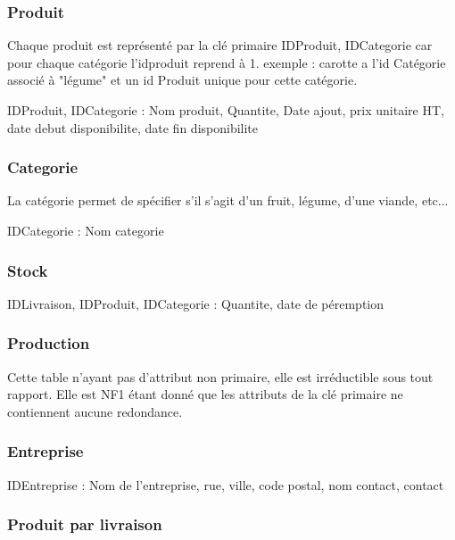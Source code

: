 \documentclass[a4paper, 12pt]{report}
\begin{document}
\begin{spacing}{1.2}
\textcolor{colortitre3}{\subsubsection*{\hypertarget{Produit}{Produit}}}

Chaque produit est représenté par la clé primaire IDProduit, IDCategorie car pour chaque catégorie l'idproduit reprend à 1. exemple : carotte a l'id Catégorie associé à "légume" et un id Produit unique pour cette catégorie.

IDProduit, IDCategorie : Nom produit, Quantite, Date ajout, prix unitaire HT, date debut disponibilite, date fin disponibilite \\


\textcolor{colortitre3}{\subsubsection*{\hypertarget{Categorie}{Categorie}}}

La catégorie permet de spécifier s'il s'agit d'un fruit, légume, d'une viande, etc...

IDCategorie : Nom categorie


\textcolor{colortitre3}{\subsubsection*{\hypertarget{Stock}{Stock}}}

IDLivraison, IDProduit, IDCategorie : Quantite, date de péremption


\textcolor{colortitre3}{\subsubsection*{\hypertarget{Production}{Production}}}

Cette table n'ayant pas d'attribut non primaire, elle est irréductible sous tout rapport. Elle est NF1 étant donné que les attributs de la clé primaire ne contiennent aucune redondance.

\textcolor{colortitre3}{\subsubsection*{\hypertarget{Entreprise}{Entreprise}}}

IDEntreprise : Nom de l'entreprise, rue, ville, code postal, nom contact, contact


\textcolor{colortitre3}{\subsubsection*{\hypertarget{ppl}{Produit par livraison}}}


\end{spacing}
\end{document}
